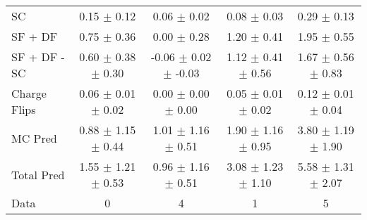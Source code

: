 \begin{tabular}{l|cccc}
                                 SC &  0.15 $\pm$  0.12 &  0.06 $\pm$  0.02 &  0.08 $\pm$  0.03 &  0.29 $\pm$  0.13 \\
                            SF + DF &  0.75 $\pm$  0.36 &  0.00 $\pm$  0.28 &  1.20 $\pm$  0.41 &  1.95 $\pm$  0.55 \\
\hline
                       SF + DF - SC &  0.60 $\pm$  0.38 $\pm$  0.30 & -0.06 $\pm$  0.02 $\pm$ -0.03 &  1.12 $\pm$  0.41 $\pm$  0.56 &  1.67 $\pm$  0.56 $\pm$  0.83 \\
\hline\hline
                       Charge Flips &  0.06 $\pm$  0.01 $\pm$  0.02 &  0.00 $\pm$  0.00 $\pm$  0.00 &  0.05 $\pm$  0.01 $\pm$  0.02 &  0.12 $\pm$  0.01 $\pm$  0.04 \\
\hline
                            MC Pred &  0.88 $\pm$  1.15 $\pm$  0.44 &  1.01 $\pm$  1.16 $\pm$  0.51 &  1.90 $\pm$  1.16 $\pm$  0.95 &  3.80 $\pm$  1.19 $\pm$  1.90 \\
\hline
                         Total Pred &  1.55 $\pm$  1.21 $\pm$  0.53 &  0.96 $\pm$  1.16 $\pm$  0.51 &  3.08 $\pm$  1.23 $\pm$  1.10 &  5.58 $\pm$  1.31 $\pm$  2.07 \\
\hline\hline
                               Data &     0 &     4 &     1 &     5 \\
\hline\hline
\end{tabular}

